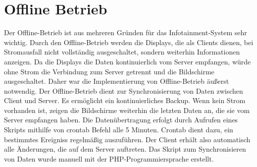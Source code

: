\section{Offline Betrieb}
Der Offline-Betrieb ist aus mehreren Gründen für das Infotainment-System sehr wichtig. Durch den Offline-Betrieb werden die Displays, die als Clients dienen, bei Stromausfall nicht vollständig ausgeschaltet, sondern weiterhin Informationen anzeigen. Da die Displays die Daten kontinuierlich vom Server empfangen, würde ohne Strom die Verbindung zum Server getrennt und die Bildschirme ausgeschaltet. Daher war die Implementierung von Offline-Betrieb äußerst notwendig. Der Offline-Betrieb dient zur Synchronisierung von Daten zwischen Client und Server. Es ermöglicht ein kontinuierliches Backup. Wenn kein Strom vorhanden ist, zeigen die Bildschirme weiterhin die letzten Daten an, die sie vom Server empfangen haben. Die Datenübertragung erfolgt durch Aufrufen eines Skripts mithilfe von crontab Befehl alle 5 Minuten. Crontab dient dazu, ein bestimmtes Ereigniss regelm\"a\ss{}ig auszuf\"uhren. Der Client erhält also automatisch alle Änderungen, die auf dem Server auftreten. Das Skript zum Synchronisieren von Daten wurde manuell mit der PHP-Programmiersprache erstellt.
